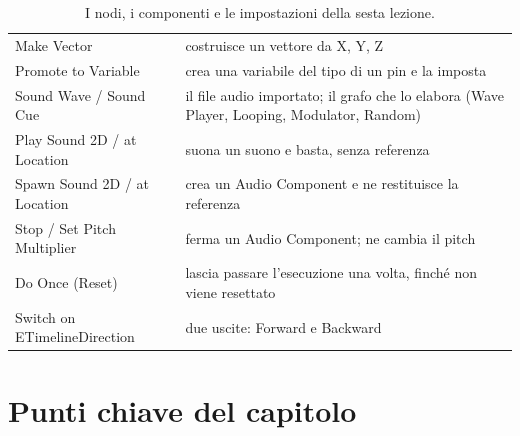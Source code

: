 \begin{table}[htbp]
\begin{tabular}{@{}p{4.4cm}p{9.6cm}@{}}
Make Vector & costruisce un vettore da X, Y, Z \\
Promote to Variable & crea una variabile del tipo di un pin e la imposta \\
Sound Wave / Sound Cue & il file audio importato; il grafo che lo elabora (Wave Player,
Looping, Modulator, Random) \\
Play Sound 2D / at Location & suona un suono e basta, senza referenza \\
Spawn Sound 2D / at Location & crea un Audio Component e ne restituisce la referenza \\
Stop / Set Pitch Multiplier & ferma un Audio Component; ne cambia il pitch \\
Do Once (Reset) & lascia passare l'esecuzione una volta, finché non viene resettato \\
Switch on ETimelineDirection & due uscite: Forward e Backward \\
\bottomrule
\end{tabular}
\caption{I nodi, i componenti e le impostazioni della sesta lezione.}
\label{ue6:tab:nodi}
\end{table}

\section*{Punti chiave del capitolo}


